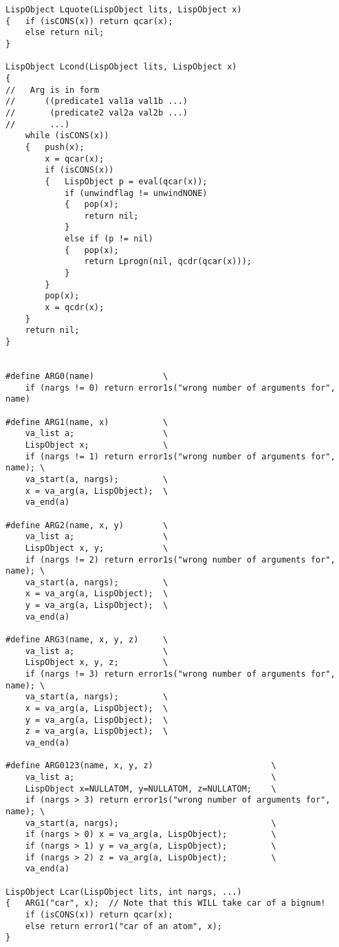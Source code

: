 {\begin{verbatim}
LispObject Lquote(LispObject lits, LispObject x)
{   if (isCONS(x)) return qcar(x);
    else return nil;
}

LispObject Lcond(LispObject lits, LispObject x)
{
//   Arg is in form
//      ((predicate1 val1a val1b ...)
//       (predicate2 val2a val2b ...)
//       ...)
    while (isCONS(x))
    {   push(x);
        x = qcar(x);
        if (isCONS(x))
        {   LispObject p = eval(qcar(x));
            if (unwindflag != unwindNONE)
            {   pop(x);
                return nil;
            }
            else if (p != nil)
            {   pop(x);
                return Lprogn(nil, qcdr(qcar(x)));
            }
        }
        pop(x);
        x = qcdr(x);
    }
    return nil;
}


#define ARG0(name)              \
    if (nargs != 0) return error1s("wrong number of arguments for", name)

#define ARG1(name, x)           \
    va_list a;                  \
    LispObject x;               \
    if (nargs != 1) return error1s("wrong number of arguments for", name); \
    va_start(a, nargs);         \
    x = va_arg(a, LispObject);  \
    va_end(a)

#define ARG2(name, x, y)        \
    va_list a;                  \
    LispObject x, y;            \
    if (nargs != 2) return error1s("wrong number of arguments for", name); \
    va_start(a, nargs);         \
    x = va_arg(a, LispObject);  \
    y = va_arg(a, LispObject);  \
    va_end(a)

#define ARG3(name, x, y, z)     \
    va_list a;                  \
    LispObject x, y, z;         \
    if (nargs != 3) return error1s("wrong number of arguments for", name); \
    va_start(a, nargs);         \
    x = va_arg(a, LispObject);  \
    y = va_arg(a, LispObject);  \
    z = va_arg(a, LispObject);  \
    va_end(a)

#define ARG0123(name, x, y, z)                        \
    va_list a;                                        \
    LispObject x=NULLATOM, y=NULLATOM, z=NULLATOM;    \
    if (nargs > 3) return error1s("wrong number of arguments for", name); \
    va_start(a, nargs);                               \
    if (nargs > 0) x = va_arg(a, LispObject);         \
    if (nargs > 1) y = va_arg(a, LispObject);         \
    if (nargs > 2) z = va_arg(a, LispObject);         \
    va_end(a)

LispObject Lcar(LispObject lits, int nargs, ...)
{   ARG1("car", x);  // Note that this WILL take car of a bignum!
    if (isCONS(x)) return qcar(x);
    else return error1("car of an atom", x);
}

\end{verbatim}}
